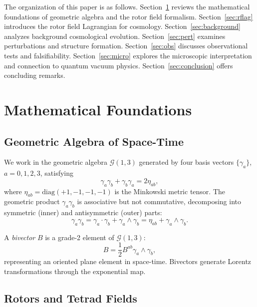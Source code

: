 \documentclass[11pt,a4paper]{article}
\numberwithin{equation}{section}
\theoremstyle{plain}
\theoremstyle{definition}
\theoremstyle{remark}
\begin{document}
The organization of this paper is as follows. Section~\ref{sec:prelim} reviews the mathematical foundations of geometric algebra and the rotor field formalism. Section~\ref{sec:rflag} introduces the rotor field Lagrangian for cosmology. Section~\ref{sec:background} analyzes background cosmological evolution. Section~\ref{sec:pert} examines perturbations and structure formation. Section~\ref{sec:obs} discusses observational tests and falsifiability. Section~\ref{sec:micro} explores the microscopic interpretation and connection to quantum vacuum physics. Section~\ref{sec:conclusion} offers concluding remarks.

\section{Mathematical Foundations}
\label{sec:prelim}

\subsection{Geometric Algebra of Space-Time}

We work in the geometric algebra $\mathcal{G}(1,3)$ generated by four basis vectors $\{\gamma_a\}$, $a=0,1,2,3$, satisfying
\begin{equation}
\gamma_a \gamma_b + \gamma_b \gamma_a = 2\eta_{ab},
\end{equation}
where $\eta_{ab} = \mathrm{diag}(+1,-1,-1,-1)$ is the Minkowski metric tensor. The geometric product $\gamma_a\gamma_b$ is associative but not commutative, decomposing into symmetric (inner) and antisymmetric (outer) parts:
\begin{equation}
\gamma_a\gamma_b = \gamma_a \cdot \gamma_b + \gamma_a \wedge \gamma_b = \eta_{ab} + \gamma_a \wedge \gamma_b.
\end{equation}

A \emph{bivector} $B$ is a grade-2 element of $\mathcal{G}(1,3)$:
\begin{equation}
B = \frac{1}{2}B^{ab}\gamma_a \wedge \gamma_b,
\end{equation}
representing an oriented plane element in space-time. Bivectors generate Lorentz transformations through the exponential map.

\subsection{Rotors and Tetrad Fields}
\end{document}
